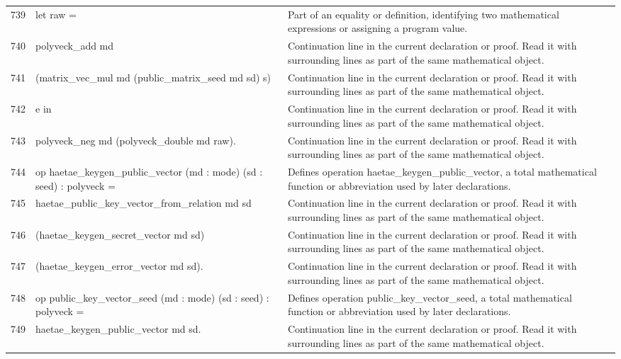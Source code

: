 \documentclass[10pt]{article}
\begin{document}
\begin{longtable}{r L{0.53\textwidth} L{0.37\textwidth}}
739 & {\ttfamily\scriptsize     let raw =} & Part of an equality or definition, identifying two mathematical expressions or assigning a program value. \\
740 & {\ttfamily\scriptsize       polyveck\_add md} & Continuation line in the current declaration or proof.  Read it with surrounding lines as part of the same mathematical object. \\
741 & {\ttfamily\scriptsize         (matrix\_vec\_mul md (public\_matrix\_seed md sd) s)} & Continuation line in the current declaration or proof.  Read it with surrounding lines as part of the same mathematical object. \\
742 & {\ttfamily\scriptsize         e in} & Continuation line in the current declaration or proof.  Read it with surrounding lines as part of the same mathematical object. \\
743 & {\ttfamily\scriptsize     polyveck\_neg md (polyveck\_double md raw).} & Continuation line in the current declaration or proof.  Read it with surrounding lines as part of the same mathematical object. \\
744 & {\ttfamily\scriptsize op haetae\_keygen\_public\_vector (md : mode) (sd : seed) : polyveck =} & Defines operation haetae\_keygen\_public\_vector, a total mathematical function or abbreviation used by later declarations. \\
745 & {\ttfamily\scriptsize   haetae\_public\_key\_vector\_from\_relation md sd} & Continuation line in the current declaration or proof.  Read it with surrounding lines as part of the same mathematical object. \\
746 & {\ttfamily\scriptsize     (haetae\_keygen\_secret\_vector md sd)} & Continuation line in the current declaration or proof.  Read it with surrounding lines as part of the same mathematical object. \\
747 & {\ttfamily\scriptsize     (haetae\_keygen\_error\_vector md sd).} & Continuation line in the current declaration or proof.  Read it with surrounding lines as part of the same mathematical object. \\
748 & {\ttfamily\scriptsize op public\_key\_vector\_seed (md : mode) (sd : seed) : polyveck =} & Defines operation public\_key\_vector\_seed, a total mathematical function or abbreviation used by later declarations. \\
749 & {\ttfamily\scriptsize   haetae\_keygen\_public\_vector md sd.} & Continuation line in the current declaration or proof.  Read it with surrounding lines as part of the same mathematical object. \\

\end{longtable}
\end{document}
